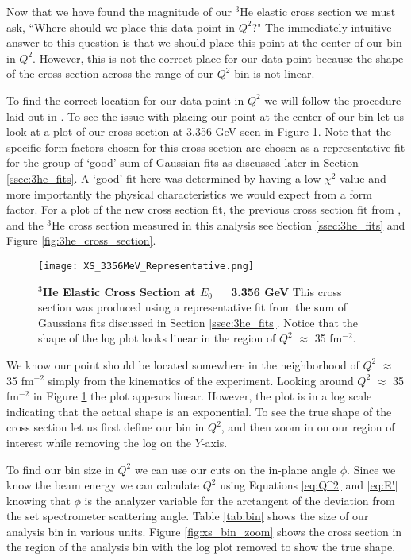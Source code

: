 Now that we have found the magnitude of our $^3$He elastic cross section we must ask, ``Where should we place this data point in $Q^2$?" The immediately intuitive answer to this question is that we should place this point at the center of our bin in $Q^2$. However, this is not the correct place for our data point because the shape of the cross section across the range of our $Q^2$ bin is not linear.
 
To find the correct location for our data point in $Q^2$ we will follow the procedure laid out in \cite{Article:data_placement}. To see the issue with placing our point at the center of our bin let us look at a plot of our cross section at 3.356 GeV seen in Figure \ref{fig:xs_bin}. Note that the specific form factors chosen for this cross section are chosen as a representative fit for the group of `good' sum of Gaussian fits as discussed later in Section \ref{ssec:3he_fits}. A `good' fit here was determined by having a low $\chi^2$ value and more importantly the physical characteristics we would expect from a form factor. For a plot of the new cross section fit, the previous cross section fit from \cite{Article:Amroun}, and the $^3$He cross section measured in this analysis see Section \ref{ssec:3he_fits} and Figure \ref{fig:3he_cross_section}.

\begin{figure}[!ht]
\begin{center}
\texttt{[image: XS\_3356MeV\_Representative.png]}
\end{center}
\caption[$^3$He Elastic Cross Section at $E_0$ = 3.356 GeV]{
{\bf{$^3$He Elastic Cross Section at $E_0$ = 3.356 GeV}} This cross section was produced using a representative fit from the sum of Gaussians fits discussed in Section \ref{ssec:3he_fits}. Notice that the shape of the log plot looks linear in the region of $Q^2$ $\approx$ 35 fm$^{-2}$.}
\label{fig:xs_bin}
\end{figure}

We know our point should be located somewhere in the neighborhood of $Q^2$ $\approx$ 35 fm$^{-2}$ simply from the kinematics of the experiment. Looking around $Q^2$ $\approx$ 35 fm$^{-2}$ in Figure \ref{fig:xs_bin} the plot appears linear. However, the plot is in a log scale indicating that the actual shape is an exponential. To see the true shape of the cross section let us first define our bin in $Q^2$, and then zoom in on our region of interest while removing the log on the $Y$-axis. 

To find our bin size in $Q^2$ we can use our cuts on the in-plane angle $\phi$. Since we know the beam energy we can calculate $Q^2$ using Equations \ref{eq:Q^2} and \ref{eq:E'} knowing that $\phi$ is the analyzer variable for the arctangent of the deviation from the set spectrometer scattering angle. Table \ref{tab:bin} shows the size of our analysis bin in various units. Figure \ref{fig:xs_bin_zoom} shows the cross section in the region of the analysis bin with the log plot removed to show the true shape.

